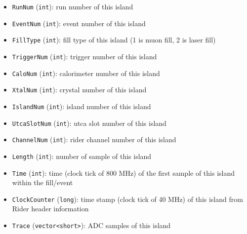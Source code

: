 \begin{itemize}
\item \verb+RunNum+ (\verb+int+): run number of this island
\item \verb+EventNum+ (\verb+int+): event number of this island
\item \verb+FillType+ (\verb+int+): fill type of this island (1 is muon fill, 2 is laser fill)
\item \verb+TriggerNum+ (\verb+int+): trigger number of this island
\item \verb+CaloNum+ (\verb+int+): calorimeter number of this island
\item \verb+XtalNum+ (\verb+int+): crystal number of this island
\item \verb+IslandNum+ (\verb+int+): island number of this island
\item \verb+UtcaSlotNum+ (\verb+int+): utca slot number of this island
\item \verb+ChannelNum+ (\verb+int+): rider channel number of this island
\item \verb+Length+ (\verb+int+): number of sample of this island
\item \verb+Time+ (\verb+int+): time (clock tick of 800 MHz) of the first sample of this island within the fill/event
\item \verb+ClockCounter+ (\verb+long+): time stamp (clock tick of 40 MHz) of this island from Rider header information
\item \verb+Trace+ (\verb+vector<short>+): ADC samples of this island
\end{itemize}

